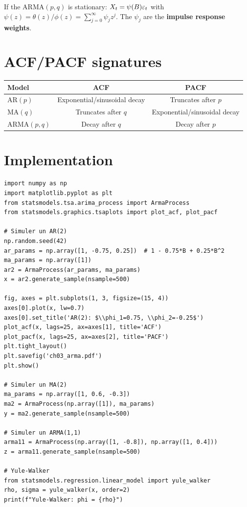 \begin{theorem}
If the ARMA$(p,q)$ is stationary: $X_t = \psi(B)\varepsilon_t$ with $\psi(z)=\theta(z)/\phi(z)=\sum_{j=0}^{\infty}\psi_j z^j$. The $\psi_j$ are the \textbf{impulse response weights}.
\end{theorem}

\section{ACF/PACF signatures}

\begin{center}
\begin{tabular}{lcc}
\toprule
\textbf{Model} & \textbf{ACF} & \textbf{PACF} \\
\midrule
AR$(p)$ & Exponential/sinusoidal decay & Truncates after $p$ \\
MA$(q)$ & Truncates after $q$ & Exponential/sinusoidal decay \\
ARMA$(p,q)$ & Decay after $q$ & Decay after $p$ \\
\bottomrule
\end{tabular}
\end{center}

\section{Implementation}

\begin{codeblock}[title=\textbf{Python}]
\begin{verbatim}
import numpy as np
import matplotlib.pyplot as plt
from statsmodels.tsa.arima_process import ArmaProcess
from statsmodels.graphics.tsaplots import plot_acf, plot_pacf

# Simuler un AR(2)
np.random.seed(42)
ar_params = np.array([1, -0.75, 0.25])  # 1 - 0.75*B + 0.25*B^2
ma_params = np.array([1])
ar2 = ArmaProcess(ar_params, ma_params)
x = ar2.generate_sample(nsample=500)

fig, axes = plt.subplots(1, 3, figsize=(15, 4))
axes[0].plot(x, lw=0.7)
axes[0].set_title('AR(2): $\\phi_1=0.75, \\phi_2=-0.25$')
plot_acf(x, lags=25, ax=axes[1], title='ACF')
plot_pacf(x, lags=25, ax=axes[2], title='PACF')
plt.tight_layout()
plt.savefig('ch03_arma.pdf')
plt.show()

# Simuler un MA(2)
ma_params = np.array([1, 0.6, -0.3])
ma2 = ArmaProcess(np.array([1]), ma_params)
y = ma2.generate_sample(nsample=500)

# Simuler un ARMA(1,1)
arma11 = ArmaProcess(np.array([1, -0.8]), np.array([1, 0.4]))
z = arma11.generate_sample(nsample=500)

# Yule-Walker
from statsmodels.regression.linear_model import yule_walker
rho, sigma = yule_walker(x, order=2)
print(f"Yule-Walker: phi = {rho}")
\end{verbatim}
\end{codeblock}

